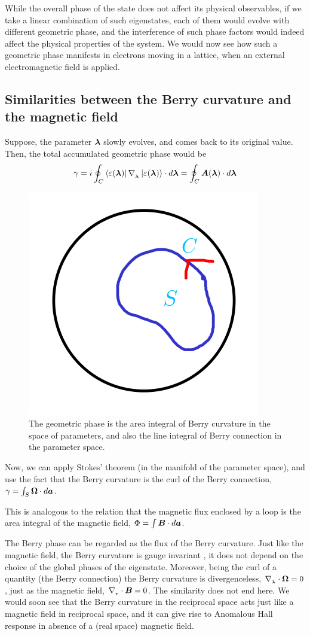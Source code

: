 \documentclass{report}
\renewcommand\vec[1]{\ensuremath\boldsymbol{#1}} %
\begin{document}
While the overall phase of the state does not affect its physical observables, if we take a linear combination of such eigenstates, each of them would evolve with different geometric phase, and the interference of such phase factors would indeed affect the physical properties of the system. We would now see how such a geometric phase manifests in electrons moving in a lattice, when an external electromagnetic field is applied.

\subsection{Similarities between the Berry curvature and the magnetic field}
Suppose, the parameter $\vec{\lambda}$ slowly evolves, and comes back to its original value. Then, the total accumulated geometric phase would be $$\gamma = i\oint_C \bra{\varepsilon({\vec{\lambda}})}\nabla_{_{\vec{\lambda}}} \ket{\varepsilon({\vec{\lambda}})} \cdot d \vec{\lambda} = \oint_C \vec{A}(\vec{\lambda}) \cdot d \vec{\lambda}$$
\begin{figure}[h!]
	\centering
	\includegraphics[width=0.4\linewidth]{berry-curv-as-magnetic}
	\caption{The geometric phase is the area integral of Berry curvature in the space of parameters, and also the line integral of Berry connection in the parameter space.}
	\label{fig:berry-curv-as-magnetic}
\end{figure}
Now, we can apply Stokes' theorem (in the manifold of the parameter space), and use the fact that the Berry curvature is the curl of the Berry connection, $\gamma = \int_S \vec{\Omega} \cdot d \vec{a}$.

This is analogous to the relation that the magnetic flux enclosed by a loop is the area integral of the magnetic field, $\Phi = \int \vec{B} \cdot d\vec{a}$.

The Berry phase can be regarded as the flux of the Berry curvature. Just like the magnetic field, the Berry curvature is gauge invariant \cite{BerryQuantalPhase1984}, it does not depend on the choice of the global phases of the eigenstate. Moreover, being the curl of a quantity (the Berry connection) the Berry curvature is divergenceless, $\nabla_{_{\vec{\lambda}}} \cdot \vec{\Omega} = 0$, just as the magnetic field, $\nabla_{_{\vec{r}}} \cdot \vec{B} = 0$. The similarity does not end here. We would soon see that the Berry curvature in the reciprocal space acts just like a magnetic field in reciprocal space, and it can give rise to Anomalous Hall response in absence of a (real space) magnetic field.
\end{document}
